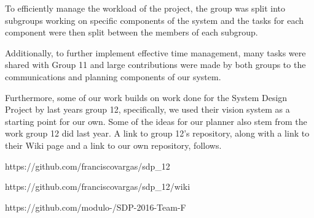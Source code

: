 ﻿\documentclass[12pt,a4paper,titlepage]{article}
\begin{document}
To efficiently manage the workload of the project, the group was split into subgroups working on specific components of the system and the tasks for each component were then split between the members of each subgroup. 

Additionally, to further implement effective time management, many tasks were shared with Group 11 and large contributions were made by both groups to the communications and planning components of our system.

Furthermore, some of our work builds on work done for the System Design Project by last years group 12, specifically, we used their vision system as a starting point for our own. Some of the ideas for our planner also stem from the work group 12 did last year.
A link to group 12's repository, along with a link to their Wiki page and a link to our own repository, follows.

https://github.com/franciscovargas/sdp_12

https://github.com/franciscovargas/sdp_12/wiki

https://github.com/modulo-/SDP-2016-Team-F
%
%
%
%
%
\end{document}
